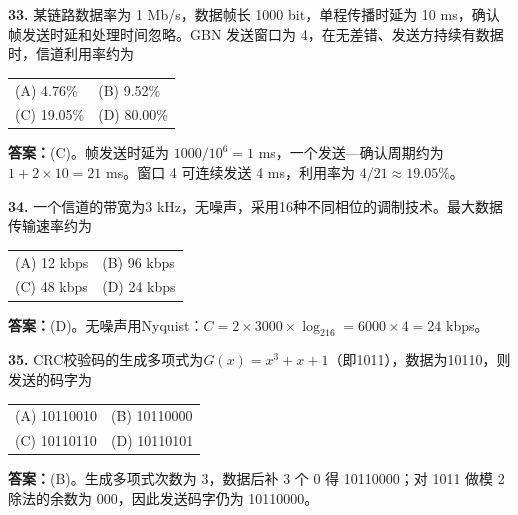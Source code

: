 \noindent\textbf{33.} 某链路数据率为 1 Mb/s，数据帧长 1000 bit，单程传播时延为 10 ms，确认帧发送时延和处理时间忽略。GBN 发送窗口为 4，在无差错、发送方持续有数据时，信道利用率约为
\begin{center}
\begin{tabular}{ll}
(A) 4.76\% & (B) 9.52\% \\[6pt]
(C) 19.05\% & (D) 80.00\%
\end{tabular}
\end{center}

\ifshowsolutions\par\noindent\textbf{答案：}(C)。帧发送时延为 $1000/10^6=1$ ms，一个发送—确认周期约为 $1+2\times10=21$ ms。窗口 4 可连续发送 4 ms，利用率为 $4/21\approx19.05\%$。\else \answerarea \fi

\vspace{6pt}

\noindent\textbf{34.} 一个信道的带宽为3 kHz，无噪声，采用16种不同相位的调制技术。最大数据传输速率约为
\begin{center}
\begin{tabular}{ll}
(A) 12 kbps & (B) 96 kbps \\[6pt]
(C) 48 kbps & (D) 24 kbps
\end{tabular}
\end{center}

\ifshowsolutions\par\noindent\textbf{答案：}(D)。无噪声用Nyquist：$C=2\times3000\times\log_216=6000\times4=24$ kbps。\else \answerarea \fi

\vspace{6pt}

\noindent\textbf{35.} CRC校验码的生成多项式为$G(x)=x^3+x+1$（即1011），数据为10110，则发送的码字为
\begin{center}
\begin{tabular}{ll}
(A) 10110010 & (B) 10110000 \\[6pt]
(C) 10110110 & (D) 10110101
\end{tabular}
\end{center}

\ifshowsolutions\par\noindent\textbf{答案：}(B)。生成多项式次数为 3，数据后补 3 个 0 得 10110000；对 1011 做模 2 除法的余数为 000，因此发送码字仍为 10110000。\else \answerarea \fi

\vspace{6pt}

